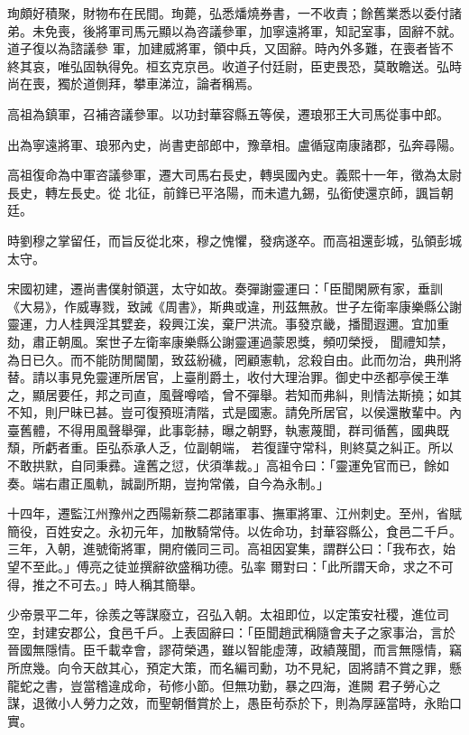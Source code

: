 \begin{pinyinscope}
 珣頗好積聚，財物布在民間。珣薨，弘悉燔燒券書，一不收責；餘舊業悉以委付諸弟。未免喪，後將軍司馬元顯以為咨議參軍，加寧遠將軍，知記室事，固辭不就。道子復以為諮議參
 軍，加建威將軍，領中兵，又固辭。時內外多難，在喪者皆不終其哀，唯弘固執得免。桓玄克京邑。收道子付廷尉，臣吏畏恐，莫敢瞻送。弘時尚在喪，獨於道側拜，攀車涕泣，論者稱焉。



 高祖為鎮軍，召補咨議參軍。以功封華容縣五等侯，遷琅邪王大司馬從事中郎。



 出為寧遠將軍、琅邪內史，尚書吏部郎中，豫章相。盧循寇南康諸郡，弘奔尋陽。



 高祖復命為中軍咨議參軍，遷大司馬右長史，轉吳國內史。義熙十一年，徵為太尉長史，轉左長史。從
 北征，前鋒已平洛陽，而未遣九錫，弘銜使還京師，諷旨朝廷。



 時劉穆之掌留任，而旨反從北來，穆之愧懼，發病遂卒。而高祖還彭城，弘領彭城太守。



 宋國初建，遷尚書僕射領選，太守如故。奏彈謝靈運曰：「臣聞閑厥有家，垂訓《大易》，作威專戮，致誡《周書》，斯典或違，刑茲無赦。世子左衛率康樂縣公謝靈運，力人桂興淫其嬖妾，殺興江涘，棄尸洪流。事發京畿，播聞遐邇。宜加重劾，肅正朝風。案世子左衛率康樂縣公謝靈運過蒙恩獎，頻叨榮授，
 聞禮知禁，為日已久。而不能防閒閫闈，致茲紛穢，罔顧憲軌，忿殺自由。此而勿治，典刑將替。請以事見免靈運所居官，上臺削爵土，收付大理治罪。御史中丞都亭侯王準之，顯居要任，邦之司直，風聲噂𠴲，曾不彈舉。若知而弗糾，則情法斯撓；如其不知，則尸昧已甚。豈可復預班清階，式是國憲。請免所居官，以侯還散輩中。內臺舊體，不得用風聲舉彈，此事彰赫，曝之朝野，執憲蔑聞，群司循舊，國典既頹，所虧者重。臣弘忝承人乏，位副朝端，
 若復謹守常科，則終莫之糾正。所以不敢拱默，自同秉彞。違舊之愆，伏須準裁。」高祖令曰：「靈運免官而已，餘如奏。端右肅正風軌，誠副所期，豈拘常儀，自今為永制。」



 十四年，遷監江州豫州之西陽新蔡二郡諸軍事、撫軍將軍、江州刺史。至州，省賦簡役，百姓安之。永初元年，加散騎常侍。以佐命功，封華容縣公，食邑二千戶。三年，入朝，進號衛將軍，開府儀同三司。高祖因宴集，謂群公曰：「我布衣，始望不至此。」傅亮之徒並撰辭欲盛稱功德。弘率
 爾對曰：「此所謂天命，求之不可得，推之不可去。」時人稱其簡舉。



 少帝景平二年，徐羨之等謀廢立，召弘入朝。太祖即位，以定策安社稷，進位司空，封建安郡公，食邑千戶。上表固辭曰：「臣聞趙武稱隨會夫子之家事治，言於晉國無隱情。臣千載幸會，謬荷榮遇，雖以智能虛薄，政績蔑聞，而言無隱情，竊所庶幾。向令天啟其心，預定大策，而名編司勳，功不見紀，固將請不賞之罪，懸龍蛇之書，豈當稽違成命，茍修小節。但無功勤，暴之四海，進闕
 君子勞心之謀，退微小人勞力之效，而聖朝僭賞於上，愚臣茍忝於下，則為厚誣當時，永貽口實。




\end{pinyinscope}
